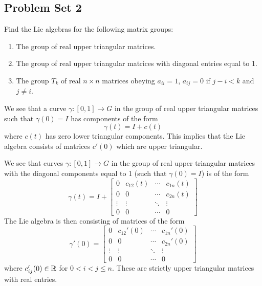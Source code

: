 \subsection{Problem Set 2}
\begin{exercise}\label{exercise1HW2}
Find the Lie algebras for the following matrix groups:
\begin{enumerate}
\item The group of real upper triangular matrices.
\item The group of real upper triangular matrices with diagonal
  entries equal to 1.
\item The group $T_{k}$ of real $n\times n$ matrices obeying
  $a_{ii}=1$, $a_{ij}=0$ if $j-i<k$ and $j\not=i$.
\end{enumerate}
\end{exercise}

We see that a curve $\gamma\colon[0,1]\to G$ in the group of real
upper triangular matrices such that $\gamma(0)=I$ has components
of the form
\begin{equation}
\gamma(t)=I+c(t)
\end{equation}
where $c(t)$ has zero lower triangular components. This implies
that the Lie algebra consists of matrices $c'(0)$ which are upper
triangular. 

\medbreak
{}
We see that curves $\gamma\colon[0,1]\to G$ in the group of real
upper triangular matrices with the diagonal components equal to 1
(such that $\gamma(0)=I$) is of the form
\begin{equation}
\gamma(t)=I+\begin{bmatrix} 
0 & c_{12}(t) & \cdots & c_{1n}(t)\\
0 & 0        & \cdots & c_{2n}(t)\\
\vdots & \vdots & \ddots & \vdots\\
0 & 0        & \cdots & 0\end{bmatrix}
\end{equation}
The Lie algebra is then consisting of matrices of the form
\begin{equation}
\gamma'(0)=\begin{bmatrix} 
0 & c_{12}'(0) & \cdots & c_{1n}'(0)\\
0 & 0        & \cdots & c_{2n}'(0)\\
\vdots & \vdots & \ddots & \vdots\\
0 & 0        & \cdots & 0\end{bmatrix}
\end{equation}
where $c_{ij}'(0)\in\Bbb{R}$ for $0<i<j\leq n$. These are
strictly upper triangular matrices with real entries.

